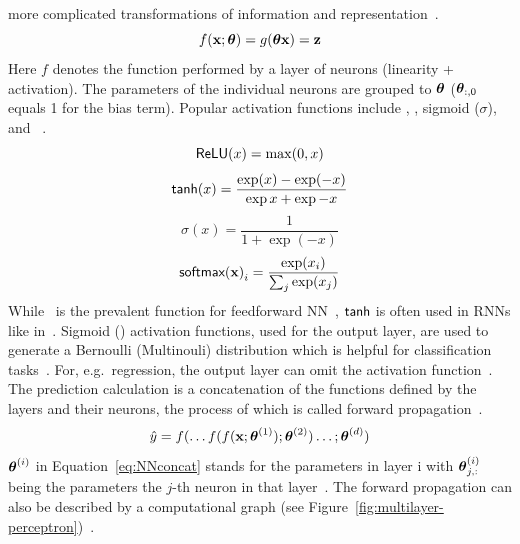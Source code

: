 more complicated transformations of information and representation~\citep{goodfellow_deep_2016}.
\begin{equation}\label{eq:neuron}
    f(\textbf{x};\boldsymbol{\theta}) = g(\boldsymbol{\theta}\textbf{x})=\textbf{z}
\end{equation}
Here $f$ denotes the function performed by a layer of neurons (linearity + activation).
The parameters of the individual neurons are grouped to $\boldsymbol{\theta}$ ($\boldsymbol{\theta}_{:,0}$ equals 1 for the
bias term).
Popular activation functions include \relu, \tahn, sigmoid ($\sigma$), and
\sfmx~\citep{shrestha_review_2019}.
\begin{equation}\label{eq:relu}
    \textsf{ReLU}(x)=\max(0,x)
\end{equation}
\begin{equation}\label{eq:tanh}
    \textsf{tanh}(x)=\frac{\exp(x)-\exp(-x)}{\exp{x}+\exp{-x}}
\end{equation}
\begin{equation}\label{eq:sigmoid}
    \sigma(x)=\frac{1}{1+\exp(-x)}
\end{equation}
\begin{equation}\label{eq:softmax}
    {\textsf{softmax}(\textbf{x})}_i = \frac{\exp(x_i)}{\sum_j \exp(x_j)}
\end{equation}
While \relu\ is the prevalent function for feedforward \ac{NN}~\citep{goodfellow_deep_2016},
$\textsf{tanh}$ is often used in \acp{RNN} like in~\cite{sherstinsky_fundamentals_2020,greff_lstm_2017}.
Sigmoid (\sfmx) activation functions, used for the output layer, are used to generate a Bernoulli
(Multinouli) distribution which is helpful for classification tasks~\citep{goodfellow_deep_2016}.
For, e.g.\ regression, the output layer can omit the activation
function~\citep{goodfellow_deep_2016}.
The prediction calculation is a concatenation of the functions defined by the
layers and their neurons, the process of which is called
forward propagation~\citep{ponti_everything_2017,goodfellow_deep_2016}.
\begin{equation}\label{eq:NNconcat}
    \hat{y}=f(\ldots f(f(\textbf{x};\boldsymbol{\theta}^{(1)});\boldsymbol{\theta}^{(2)})\ldots;\boldsymbol{\theta}^{(d)})
\end{equation}
$\boldsymbol{\theta}^{(i)}$ in Equation~\ref{eq:NNconcat} stands for the parameters in layer i with $\boldsymbol{\theta}^{(i)}_{j,:}$
being the parameters the $j$-th neuron in that layer~\citep{goodfellow_deep_2016}.
The forward propagation can also be described by a computational graph (see
Figure~\ref{fig:multilayer-perceptron})~\citep{goodfellow_deep_2016}.


